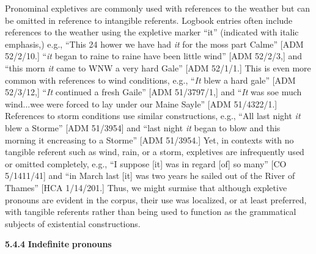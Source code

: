 Pronominal expletives are commonly used with references to the weather but can be omitted in reference to intangible referents.  Logbook entries often include references to the weather using the expletive marker “it” (indicated with italic emphasis,) e.g., “This 24 hower we have had \textit{it} for the moss part Calme” [ADM 52/2/10.] “\textit{it} began to raine to raine have been little wind” [ADM 52/2/3,] and “this morn \textit{it} came to WNW a very hard Gale” [ADM 52/1/1.] This is even more common with references to wind conditions, e.g., “\textit{It} blew a hard gale” [ADM 52/3/12,] “\textit{It} continued a fresh Gaile” [ADM 51/3797/1,] and “\textit{It} was soe much wind...wee were forced to lay under our Maine Sayle” [ADM 51/4322/1.] References to storm conditions use similar constructions, e.g., “All last night \textit{it} blew a Storme” [ADM 51/3954] and “last night \textit{it} began to blow and this morning it encreasing to a Storme” [ADM 51/3954.] Yet, in contexts with no tangible referent such as wind, rain, or a storm, expletives are infrequently used or omitted completely, e.g., “I suppose [it] was in regard [of] so many” [CO 5/1411/41] and “in March last [it] was two years he sailed out of the River of Thames” [HCA 1/14/201.] Thus, we might surmise that although expletive pronouns are evident in the corpus, their use was localized, or at least preferred, with tangible referents rather than being used to function as the grammatical subjects of existential constructions.

\textbf{5.4.4} \textbf{Indefinite} \textbf{pronouns}

